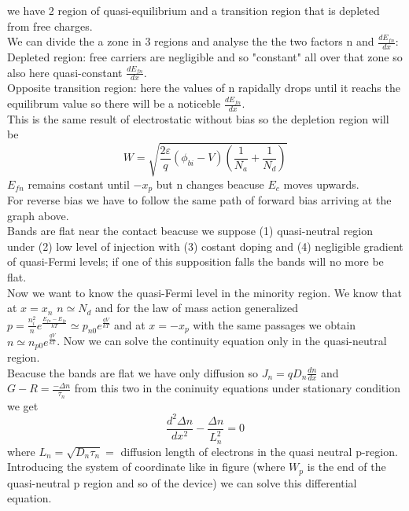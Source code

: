 we have 2 region of quasi-equilibrium and a transition region that is depleted from free charges.\\
\vspace{3mm}
We can divide the a zone in 3 regions and analyse the the two factors n and $\frac{dE_{fn}}{dx}$:\\ 
\tab Depleted region: free carriers are negligible and so "constant" all over that zone so also here quasi-constant $\frac{dE_{fn}}{dx}$.\\
\tab Opposite transition region: here the values of n rapidally drops until it reachs the equilibrum value so there will be a noticeble $\frac{dE_{fn}}{dx}$.\\
\vspace{3mm}  
This is the same result of electrostatic without bias so the depletion region will be
\begin{equation}
W=\sqrt{\frac{2\varepsilon}{q}(\phi_{bi}-V)(\frac{1}{N_a}+\frac{1}{N_d})}
\end{equation}
$E_{fn}$ remains costant until $-x_p$ but n changes beacuse $E_c$ moves upwards.\\
For reverse bias we have to follow the same path of forward bias arriving at the graph above.\\
Bands are flat near the contact beacuse we suppose (1) quasi-neutral region under (2) low level of injection with (3) costant doping and (4) negligible gradient of quasi-Fermi levels; if one of this supposition falls the bands will no more be flat.\\
\vspace{5mm}
\label{cont.eq}
Now we want to know the quasi-Fermi level in the minority region.
We know that at $x=x_n$ $n\simeq N_d$ and for the law of mass action generalized $p=\frac{n_i^2}{n}e^{\frac{E_{fn}-E_{fp}}{kT}}\simeq p_{n0}e^{\frac{qV}{kT}}$ and at $x=-x_p$ with the same passages we obtain $n\simeq n_{p0}e^{\frac{qV}{kT}}$. Now we can solve the continuity equation only in the quasi-neutral region. \\
Beacuse the bands are flat we have only diffusion so $J_n=qD_n \frac{dn}{dx}$ and $G-R=\frac{-\Delta n}{\tau_n}$ from this two in the coninuity equations under stationary condition we get
\begin{equation}
\frac{d^2\Delta n}{dx^2}-\frac{\Delta n}{L_n^2}=0
\end{equation} 
where $L_n=\sqrt{D_n\tau_n}=$ diffusion length of electrons in the quasi neutral p-region. Introducing the system of coordinate like in figure (where $W_p$ is the end of the quasi-neutral p region and so of the device) we can solve this differential equation.

